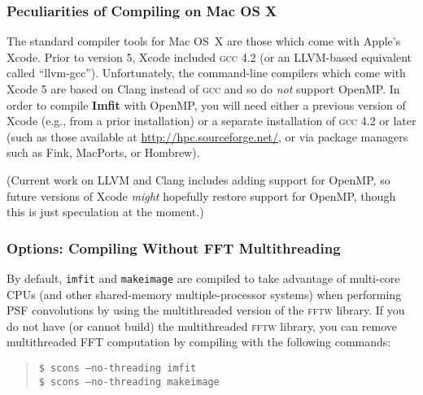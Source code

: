 \documentclass[10pt,a4paper,article]{memoir}
\newcommand{\imfit}{\textbf{Imfit}}
\newcommand{\imfitprog}{\texttt{imfit}}
\newcommand{\makeimage}{\texttt{makeimage}}
\begin{document}
\subsubsection{Peculiarities of Compiling on Mac OS X}

The standard compiler tools for Mac OS~X are those which come with
Apple's Xcode. Prior to version 5, Xcode included
\textsc{gcc} 4.2 (or an LLVM-based equivalent called ``llvm-gcc'').
Unfortunately, the command-line compilers which come with Xcode 5 are
based on Clang instead of \textsc{gcc} and so do \textit{not} support
OpenMP. In order to compile \imfit{} with OpenMP, you will need either a previous
version of Xcode (e.g., from a prior installation) or a separate
installation of \textsc{gcc} 4.2 or later (such as those available at
\url{http://hpc.sourceforge.net/}, or via package managers such as Fink,
MacPorts, or Hombrew).

(Current work on LLVM and Clang includes adding support for OpenMP, so future versions
of Xcode \textit{might} hopefully restore support for OpenMP, though this is just
speculation at the moment.)



\subsubsection{Options: Compiling Without FFT Multithreading}

By default, \imfitprog{} and \makeimage{} are compiled to take advantage of multi-core CPUs (and other
shared-memory multiple-processor systems) when performing PSF convolutions by using the 
multithreaded version of the
\textsc{fftw} library. If you do not have (or cannot build) the multithreaded \textsc{fftw} library,
you can remove multithreaded FFT computation by compiling with the following commands:
\begin{quote}
\texttt{\$ scons --no-threading imfit} \\
\texttt{\$ scons --no-threading makeimage}
\end{quote}

\end{document}
